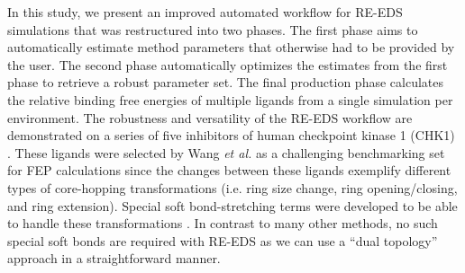 In this study, we present an improved automated workflow for RE-EDS simulations that was restructured into two phases. The first phase aims to automatically estimate method parameters that otherwise had to be provided by the user. The second phase automatically optimizes the estimates from the first phase to retrieve a robust parameter set. The final production phase calculates the relative binding free energies of multiple ligands from a single simulation per environment. 
The robustness and versatility of the RE-EDS workflow are demonstrated on a series of five inhibitors of human checkpoint kinase 1 (CHK1) \cite{Huang2012}.
These ligands were selected by Wang \textit{et al.} \cite{Wang2017} as a challenging benchmarking set for FEP calculations since the changes between these ligands exemplify different types of core-hopping transformations (i.e. ring size change, ring opening/closing, and ring extension). Special soft bond-stretching terms were developed to be able to handle these transformations \cite{Wang2017}. In contrast to many other methods, no such special soft bonds are required with RE-EDS as we can use a ``dual topology'' approach \cite{Riniker2011} in a straightforward manner. 
\FloatBarrier